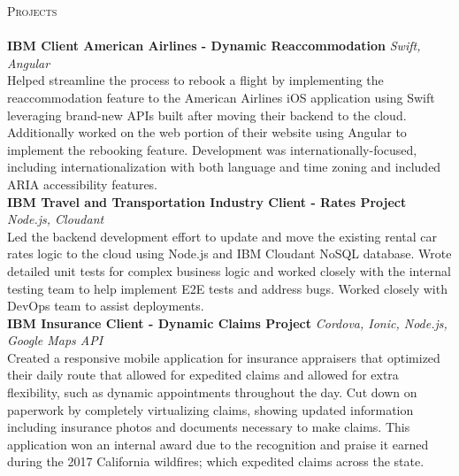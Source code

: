 \documentclass[a4paper]{article}
\newcommand{\lineunder} {
    \vspace*{-8pt} \\
    \hspace*{-18pt} \hrulefill \\
}
\newcommand{\header} [1] {
    {\hspace*{-18pt}\vspace*{6pt} \textsc{#1}}
    \vspace*{-6pt} \lineunder
}
\begin{document}
\pagebreak

\vspace{2mm}
\header{Projects}
{\textbf{IBM Client American Airlines -  Dynamic Reaccommodation}} {\sl Swift, Angular} \\
Helped streamline the process to rebook a flight by implementing the reaccommodation feature to the American Airlines iOS application using Swift leveraging brand-new APIs built after moving their backend to the cloud. Additionally worked on the web portion of their website using Angular to implement the rebooking feature. Development was internationally-focused, including internationalization with both language and time zoning and included ARIA accessibility features.\\
\vspace*{2mm}
{\textbf{IBM Travel and Transportation Industry Client - Rates Project}} {\sl Node.js, Cloudant} \\
Led the backend development effort to update and move the existing rental car rates logic to the cloud using Node.js and IBM Cloudant NoSQL database. Wrote detailed unit tests for complex business logic and worked closely with the internal testing team to help implement E2E tests and address bugs. Worked closely with DevOps team to assist deployments.\\
\vspace*{2mm}
{\textbf{IBM Insurance Client  - Dynamic Claims Project}} {\sl Cordova, Ionic, Node.js, Google Maps API} \\
Created a responsive mobile application for insurance appraisers that optimized their daily route that allowed for expedited claims and allowed for extra flexibility, such as dynamic appointments throughout the day. Cut down on paperwork by completely virtualizing claims, showing updated information including insurance photos and documents necessary to make claims. This application won an internal award due to the recognition and praise it earned during the 2017 California wildfires; which expedited claims across the state.\\
\vspace*{2mm}
\end{document}
